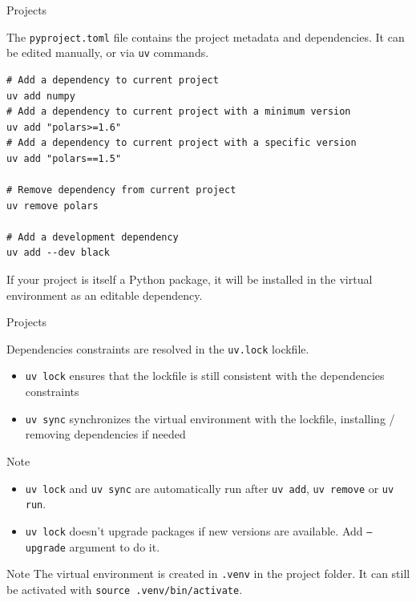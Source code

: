 \documentclass[aspectratio=169,xcolor=dvipsnames,svgnames,x11names,fleqn]{beamer}
\begin{document}
\begin{frame}[containsverbatim]{Projects}

    The \texttt{pyproject.toml} file contains the project metadata and dependencies. It can be edited manually, or via \texttt{uv} commands.

    \begin{verbatim}
# Add a dependency to current project
uv add numpy
# Add a dependency to current project with a minimum version
uv add "polars>=1.6"
# Add a dependency to current project with a specific version
uv add "polars==1.5"

# Remove dependency from current project
uv remove polars

# Add a development dependency
uv add --dev black
    \end{verbatim}

    \begin{center}
        If your project is itself a Python package, it will be installed in the virtual environment as an editable dependency.
    \end{center}
\end{frame}

\begin{frame}{Projects}

    Dependencies constraints are resolved in the \texttt{uv.lock} lockfile.
    \begin{itemize}
        \item \texttt{uv lock} ensures that the lockfile is still consistent with the dependencies constraints
        \item \texttt{uv sync} synchronizes the virtual environment with the lockfile, installing / removing dependencies if needed
    \end{itemize}

    \begin{block}{Note}
        \begin{itemize}
            \item \texttt{uv lock} and \texttt{uv sync} are automatically run after \texttt{uv add}, \texttt{uv remove} or \texttt{uv run}.
            \item \texttt{uv lock} doesn't upgrade packages if new versions are available. Add \texttt{--upgrade} argument to do it.
        \end{itemize}
    \end{block}

    \begin{block}{Note}
        The virtual environment is created in \texttt{.venv} in the project folder.
        It can still be activated with \texttt{source .venv/bin/activate}.
    \end{block}

\end{frame}
\end{document}
